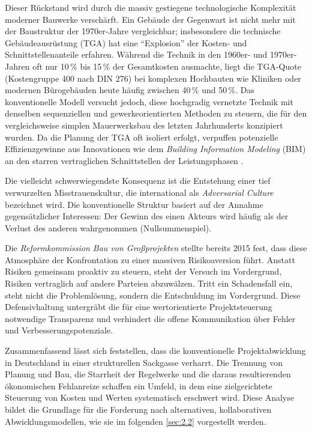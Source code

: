 Dieser Rückstand wird durch die massiv gestiegene technologische Komplexität moderner Bauwerke verschärft. Ein Gebäude der Gegenwart ist nicht mehr mit der Baustruktur der 1970er-Jahre vergleichbar; insbesondere die technische Gebäudeausrüstung (TGA) hat eine \enquote{Explosion} der Kosten- und Schnittstellenanteile erfahren. Während die Technik in den 1960er- und 1970er-Jahren oft nur 10\,\% bis 15\,\% der Gesamtkosten ausmachte, liegt die TGA-Quote (Kostengruppe 400 nach DIN 276) bei komplexen Hochbauten wie Kliniken oder modernen Bürogebäuden heute häufig zwischen 40\,\% und 50\,\%. \autocite[Vgl.][S.~113 ff]{sommer_projektmanagement_2016} Das konventionelle Modell versucht jedoch, diese hochgradig vernetzte Technik mit denselben sequenziellen und gewerkeorientierten Methoden zu steuern, die für den vergleichsweise simplen Mauerwerksbau des letzten Jahrhunderts konzipiert wurden. Da die Planung der TGA oft isoliert erfolgt, verpuffen potenzielle Effizienzgewinne aus Innovationen wie dem \textit{Building Information Modeling} (\acs{BIM}) an den starren vertraglichen Schnittstellen der Leistungsphasen \autocite[Vgl.][S.~58 ff]{becker_integrierte_2022}.

Die vielleicht schwerwiegendste Konsequenz ist die Entstehung einer tief verwurzelten Misstrauenskultur, die international als \textit{Adversarial Culture} bezeichnet wird. Die konventionelle Struktur basiert auf der Annahme gegensätzlicher Interessen: Der Gewinn des einen Akteurs wird häufig als der Verlust des anderen wahrgenommen (Nullsummenspiel).

Die \textit{Reformkommission Bau von Großprojekten} stellte bereits 2015 fest, dass diese Atmosphäre der Konfrontation zu einer massiven Risikoaversion führt. Anstatt Risiken gemeinsam proaktiv zu steuern, steht der Versuch im Vordergrund, Risiken vertraglich auf andere Parteien abzuwälzen. Tritt ein Schadensfall ein, steht nicht die Problemlösung, sondern die Entschuldung im Vordergrund. Diese Defensivhaltung untergräbt die für eine wertorientierte Projektsteuerung notwendige Transparenz und verhindert die offene Kommunikation über Fehler und Verbesserungspotenziale. \autocite[Vgl.][S.~42--44]{habib_alternative_2020}\,\autocite[Vgl.][S.~7 f]{bmvi_abschlussbericht_2015}


Zusammenfassend lässt sich feststellen, dass die konventionelle Projektabwicklung in Deutschland in einer strukturellen Sackgasse verharrt. Die Trennung von Planung und Bau, die Starrheit der Regelwerke und die daraus resultierenden ökonomischen Fehlanreize schaffen ein Umfeld, in dem eine zielgerichtete Steuerung von Kosten und Werten systematisch erschwert wird. Diese Analyse bildet die Grundlage für die Forderung nach alternativen, kollaborativen Abwicklungsmodellen, wie sie im folgenden \cref{sec:2.2} vorgestellt werden.

